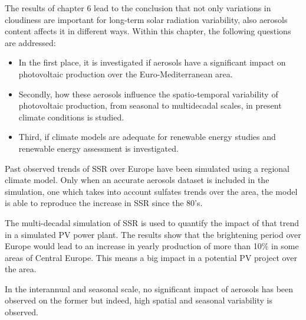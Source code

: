 The results of chapter 6 lead to the conclusion that not only variations in cloudiness are important for long-term solar radiation variability, also aerosols content affects it in different ways. Within this chapter, the following questions are addressed:

\begin{itemize}
  
\item In the first place, it is investigated if aerosols have a significant impact on photovoltaic production over the Euro-Mediterranean area.
\item Secondly, how these aerosols influence the spatio-temporal variability of photovoltaic production, from seasonal to multidecadal scales, in present climate conditions is studied.
\item Third, if climate models are adequate for renewable energy studies and renewable energy assessment is investigated.
\end{itemize}

Past observed trends of SSR over Europe have been simulated using a regional climate model. Only when an accurate aerosols dataset is included in the simulation, one which takes into account sulfates trends over the area, the model is able to reproduce the increase in SSR since the 80's.

The multi-decadal simulation of SSR is used to quantify the impact of that trend in a simulated PV power plant. The results show that the brightening period over Europe would lead to an increase in yearly production of more than 10$\%$ in some areas of Central Europe. This means a big impact in a potential PV project over the area.

In the interannual and seasonal scale, no significant impact of aerosols has been observed on the former but indeed, high spatial and seasonal variability is observed.


